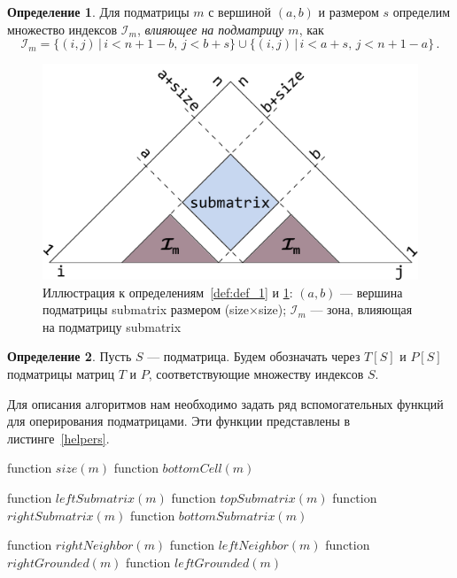 \documentclass[12pt]{article}  %
\theoremstyle{definition}
\newtheorem{definition}{Определение}[section]
\theoremstyle{remark}
\begin{document}
\begin{definition}
\label{def:def_2}
Для подматрицы $m$ с вершиной $(a,b)$ и размером $s$ определим множество индексов $\mathcal{I}_m$, \textit{влияющее на подматрицу $m$}, как 
$$\mathcal{I}_m = \{(i, j)\,|\,i < n + 1 - b,\,j < b + s\} \cup \{(i, j)\,|\,i < a + s,\,j < n + 1 - a\}\,.$$
\end{definition}


\begin{figure}[!h]
  \centering
    \includegraphics[width=0.9\linewidth]{submatrix.png}
  \caption{Иллюстрация к определениям~\ref{def:def_1} и \ref{def:def_2}: $(a,b)$ --- вершина подматрицы submatrix размером (size$\times$size); $\mathcal{I}_m$ --- зона, влияющая на подматрицу submatrix}
  \label{gr:submatrix}
\end{figure}

\begin{definition}
Пусть $S$ --- подматрица. Будем обозначать через $T[S]$ и $P[S]$ подматрицы матриц $T$ и $P$, соответствующие множеству индексов $S$.
\end{definition}

\pagebreak

Для описания алгоритмов нам необходимо задать ряд вспомогательных функций для оперирования подматрицами. Эти функции представлены в листинге~\ref{helpers}.

\begin{algorithm}[caption={Вспомогательные функции обработки подматриц}, label={helpers}]
function $size(m)$
function $bottomCell(m)$

function $leftSubmatrix(m)$
function $topSubmatrix(m)$
function $rightSubmatrix(m)$
function $bottomSubmatrix(m)$

function $rightNeighbor(m)$
function $leftNeighbor(m)$
function $rightGrounded(m)$
function $leftGrounded(m)$     
\end{algorithm}
\end{document}
